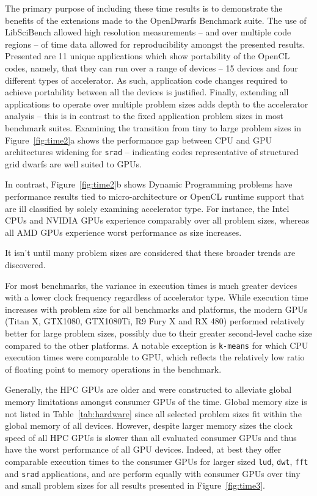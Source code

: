\documentclass[../document.tex]{subfiles}
\begin{document}
The primary purpose of including these time results is to demonstrate the benefits of the extensions made to the OpenDwarfs Benchmark suite.
The use of LibSciBench allowed high resolution measurements -- and over multiple code regions -- of time data allowed for reproducibility amongst the presented results.
Presented are 11 unique applications which show portability of the OpenCL codes, namely, that they can run over a range of devices -- 15 devices and four different types of accelerator.
As such, application code changes required to achieve portability between all the devices is justified.
Finally, extending all applications to operate over multiple problem sizes adds depth to the accelerator analysis -- this is in contrast to the fixed application problem sizes in most benchmark suites.
Examining the transition from tiny to large problem sizes in Figure~\ref{fig:time2}a shows the performance gap between CPU and GPU architectures widening for {\tt srad} -- indicating codes representative of structured grid dwarfs are well suited to GPUs.

In contrast, Figure~\ref{fig:time2}b shows Dynamic Programming problems have performance results tied to micro-architecture or OpenCL runtime support that are ill classified by solely examining accelerator type.
For instance, the Intel CPUs and NVIDIA GPUs experience comparably over all problem sizes, whereas all AMD GPUs experience worst performance as size increases.

It isn't until many problem sizes are considered that these broader trends are discovered.

For most benchmarks, the variance in execution times is much greater devices with a lower clock frequency regardless of accelerator type.
While execution time increases with problem size for all benchmarks and platforms, the modern GPUs (Titan X, GTX1080, GTX1080Ti, R9 Fury X and RX 480) performed relatively better for large problem sizes, possibly due to their greater second-level cache size compared to the other platforms.
A notable exception is {\tt k-means} for which CPU execution times were comparable to GPU, which reflects the relatively low ratio of floating point to memory operations in the benchmark.

Generally, the HPC GPUs are older and were constructed to alleviate global memory limitations amongst consumer GPUs of the time.
Global memory size is not listed in Table~\ref{tab:hardware} since all selected problem sizes fit within the global memory of all devices.
However, despite larger memory sizes the clock speed of all HPC GPUs is slower than all evaluated consumer GPUs and thus have the worst performance of all GPU devices.
Indeed, at best they offer comparable execution times to the consumer GPUs for larger sized {\tt lud}, {\tt dwt}, {\tt fft} and {\tt srad} applications, and are perform equally with consumer GPUs over tiny and small problem sizes for all results presented in Figure~\ref{fig:time3}.
\end{document}
